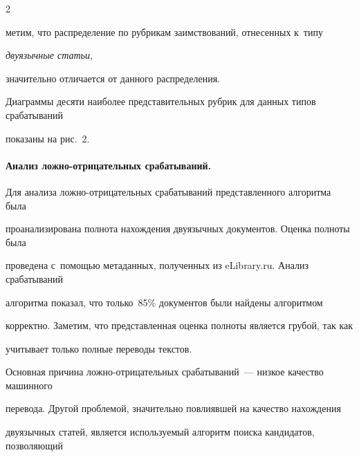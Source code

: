 \begin{multicols}{2}





\noindent


метим, что распределение по рубрикам заимствований, отнесенных к~типу 


\textit{двуязычные статьи},


 значительно отличается от данного распределения.


Диаграммы десяти наиболее представительных руб\-рик для данных типов срабатываний 


показаны на рис.~2.














\paragraph*{Анализ ложно-от\-ри\-ца\-тель\-ных срабатываний.}


Для анализа лож\-но-от\-ри\-ца\-тель\-ных срабатываний представленного алгоритма была 


проанализирована полнота нахождения двуязычных документов. Оценка полноты была 


проведена с~помощью метаданных, полученных из {\sf eLibrary.ru}. Анализ срабатываний 


алгоритма показал, что только~85$\%$ документов были найдены алгоритмом 


корректно.  Заметим, что представленная оценка полноты является грубой, так как 


учитывает только полные переводы текстов.

















Основная причина лож\-но-от\-ри\-ца\-тель\-ных срабатываний~--- низкое качество машинного 


перевода. Другой проб\-ле\-мой, значительно повлиявшей на качество нахождения 


двуязычных статей, является используемый алгоритм поиска кандидатов, позволяющий 



\end{multicols}
